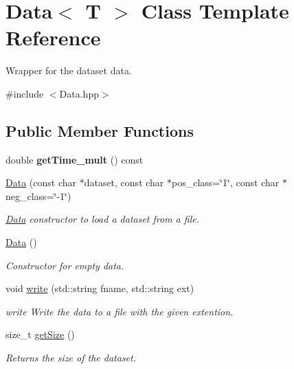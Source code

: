 \hypertarget{class_data}{}\section{Data$<$ T $>$ Class Template Reference}
\label{class_data}


Wrapper for the dataset data.  




{\ttfamily \#include $<$Data.\+hpp$>$}

\subsection*{Public Member Functions}
\begin{DoxyCompactItemize}
\item 
\mbox{\label{class_data_ab13d49c84377160673c5c38cb15d18ba}} 
double {\bfseries get\+Time\+\_\+mult} () const
\item 
\mbox{\hyperlink{class_data_a3c777650cc0c7123906cd5ff373d3fd6}{Data}} (const char $\ast$dataset, const char $\ast$pos\+\_\+class=\char`\"{}1\char`\"{}, const char $\ast$neg\+\_\+class=\char`\"{}-\/1\char`\"{})
\begin{DoxyCompactList}\small\item\em \mbox{\hyperlink{class_data}{Data}} constructor to load a dataset from a file. \end{DoxyCompactList}\item 
\mbox{\hyperlink{class_data_ab37beb31b788e0c806211af241b86bba}{Data}} ()
\begin{DoxyCompactList}\small\item\em Constructor for empty data. \end{DoxyCompactList}\item 
void \mbox{\hyperlink{class_data_a1f0bf8cc73e43cd6915289706abc46b2}{write}} (std\+::string fname, std\+::string ext)
\begin{DoxyCompactList}\small\item\em write Write the data to a file with the given extention. \end{DoxyCompactList}\item 
size\+\_\+t \mbox{\hyperlink{class_data_a310d4da4294cb3576a2faf0809c91b1e}{get\+Size}} ()
\begin{DoxyCompactList}\small\item\em Returns the size of the dataset. \end{DoxyCompactList}\item 

\end{DoxyCompactItemize}
